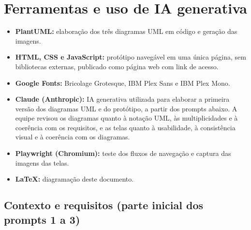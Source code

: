 \documentclass[11pt,a4paper]{article}
\begin{document}
\section{Ferramentas e uso de IA generativa}

\begin{itemize}
\item \textbf{PlantUML:} elaboração dos três diagramas UML em código e geração das imagens.
\item \textbf{HTML, CSS e JavaScript:} protótipo navegável em uma única página, sem bibliotecas externas, publicado como página web com link de acesso.
\item \textbf{Google Fonts:} Bricolage Grotesque, IBM Plex Sans e IBM Plex Mono.
\item \textbf{Claude (Anthropic):} IA generativa utilizada para elaborar a primeira versão dos diagramas UML e do protótipo, a partir dos prompts abaixo. A equipe revisou os diagramas quanto à notação UML, às multiplicidades e à coerência com os requisitos, e as telas quanto à usabilidade, à consistência visual e à coerência com os diagramas.
\item \textbf{Playwright (Chromium):} teste dos fluxos de navegação e captura das imagens das telas.
\item \textbf{LaTeX:} diagramação deste documento.
\end{itemize}

\subsection*{Contexto e requisitos (parte inicial dos prompts 1 a 3)}
\end{document}
